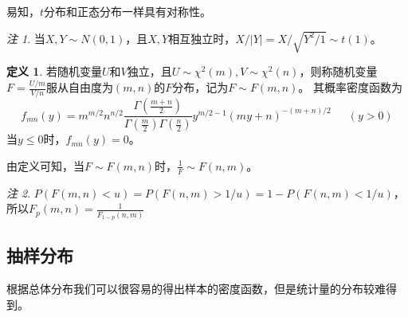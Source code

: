 \documentclass[a4paper,11pt]{article}%
\theoremstyle{remark}
\newtheorem*{remark}{注}
\theoremstyle{remark}
\theoremstyle{definition}
\theoremstyle{definition}
\newtheorem*{definition}{定义}
\theoremstyle{plain}
\newcommand*{\abs}[1]{\lvert #1 \rvert}
\begin{document}
易知，$t$分布和正态分布一样具有对称性。
\begin{remark}
    当$X,Y\sim N(0,1)$，且$X,Y$相互独立时，$X/\abs{Y}=X/\sqrt{Y^2/1}\sim t(1)$。
\end{remark}
\begin{definition}
    若随机变量$U$和$V$独立，且$U\sim \chi^2(m),V\sim \chi^2(n)$，则称随机变量$F=\frac{U/m}{V/n}$服从自由度为$(m,n)$的$F$分布，记为$F\sim F(m,n)$。
    其概率密度函数为
    \[f_{mn}(y)=m^{m/2}n^{n/2}\frac{\Gamma(\frac{m+n}{2})}{\Gamma(\frac{m}{2})\Gamma(\frac{n}{2})}y^{m/2-1}(my+n)^{-(m+n)/2}\phantom{111}(y>0)\]
    当$y\leq 0$时，$f_{mn}(y)=0$。
\end{definition}
由定义可知，当$F\sim F(m,n)$时，$\frac{1}{F}\sim F(n,m)$。
\begin{remark}$P(F(m,n)<u)=P(F(n,m)>1/u)=1-P(F(n,m)<1/u)$，所以$F_{p}(m,n)=\frac{1}{F_{1-p}(n,m)}$
\end{remark}
\subsection{抽样分布}
根据总体分布我们可以很容易的得出样本的密度函数，但是统计量的分布较难得到。
\end{document}
